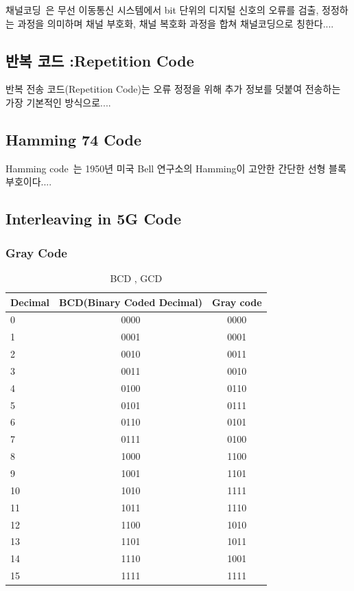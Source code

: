 \documentclass[11pt]{oblivoir}
\begin{document}
채널코딩~\cite{faruque2016introduction}은 무선 이동통신 시스템에서 bit 단위의 디지털 신호의 오류를 검출, 정정하는 과정을 의미하며 채널 부호화, 채널 복호화 과정을 합쳐 채널코딩으로 칭한다....

\subsection{반복 코드 :Repetition Code}

반복 전송 코드(Repetition Code)는 오류 정정을 위해 추가 정보를 덧붙여 전송하는 가장 기본적인 방식으로....

\subsection{Hamming 74 Code}

Hamming code~\cite{7955265}는 1950년 미국 Bell 연구소의 Hamming이 고안한 간단한 선형 블록 부호이다.... 

\newpage

\subsection{Interleaving in 5G Code}

\subsubsection{Gray Code}

\begin{table}[h!]
\footnotesize
\centering
\caption{BCD , GCD}
\begin{tabular}{@{}lcc@{}}
\toprule
Decimal& BCD(Binary Coded Decimal) & Gray code\\ \midrule
0 & 0000 & 0000\\
1 & 0001 & 0001\\
2 & 0010 & 0011\\
3 & 0011 & 0010\\
4 & 0100 & 0110\\
5 & 0101 & 0111\\
6 & 0110 & 0101\\
7 & 0111 & 0100\\
8 & 1000 & 1100\\
9 & 1001 & 1101\\
10 & 1010 & 1111\\
11 & 1011 & 1110\\
12 & 1100 & 1010\\
13 & 1101 & 1011\\
14 & 1110 & 1001\\
15 & 1111 & 1111\\
\bottomrule
\end{tabular}
\label{tab:GrayCode}
\end{table}
\end{document}
